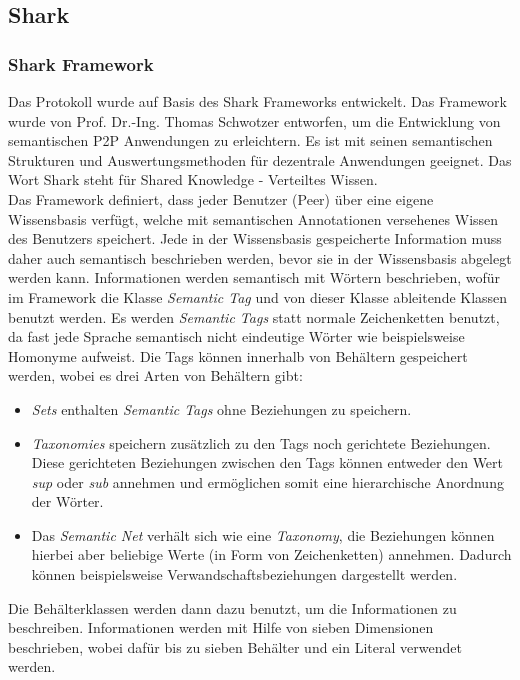 \subsection{Shark}
\subsubsection{Shark Framework}
Das Protokoll wurde auf Basis des Shark Frameworks entwickelt. Das Framework wurde von Prof. Dr.-Ing. Thomas Schwotzer entworfen, um die Entwicklung von semantischen P2P Anwendungen zu erleichtern. Es ist mit seinen semantischen Strukturen und Auswertungsmethoden für dezentrale Anwendungen geeignet. Das Wort Shark steht für Shared Knowledge - Verteiltes Wissen.
\\Das Framework definiert, dass jeder Benutzer (Peer) über eine eigene Wissensbasis verfügt, welche mit semantischen Annotationen versehenes Wissen des Benutzers speichert. Jede in der Wissensbasis gespeicherte Information muss daher auch semantisch beschrieben werden, bevor sie in der Wissensbasis abgelegt werden kann. Informationen werden semantisch mit Wörtern beschrieben, wofür im Framework die Klasse \textit{Semantic Tag} und von dieser Klasse ableitende Klassen benutzt werden. Es werden \textit{Semantic Tags} statt normale Zeichenketten benutzt, da fast jede Sprache semantisch nicht eindeutige Wörter wie beispielsweise Homonyme aufweist. Die Tags können innerhalb von Behältern gespeichert werden, wobei es drei Arten von Behältern gibt:
\begin{itemize}
	\item \textit{Sets} enthalten \textit{Semantic Tags} ohne Beziehungen zu speichern.
	\item \textit{Taxonomies} speichern zusätzlich zu den Tags noch gerichtete Beziehungen. Diese gerichteten Beziehungen zwischen den Tags können entweder den Wert \textit{sup} oder \textit{sub} annehmen und ermöglichen somit eine hierarchische Anordnung der Wörter.
	\item Das \textit{Semantic Net} verhält sich wie eine \textit{Taxonomy}, die Beziehungen können hierbei aber beliebige Werte (in Form von Zeichenketten) annehmen. Dadurch können beispielsweise Verwandschaftsbeziehungen dargestellt werden.\\
\end{itemize}
Die Behälterklassen werden dann dazu benutzt, um die Informationen zu beschreiben. Informationen werden mit Hilfe von sieben Dimensionen beschrieben, wobei dafür bis zu sieben Behälter und ein Literal verwendet werden.\\
